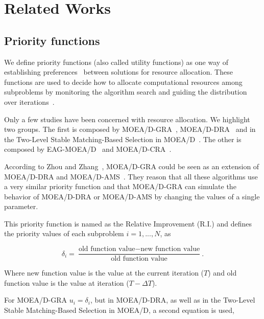 \section{Related Works}

\subsection{Priority functions}

We define priority functions (also called utility functions) as one way of establishing preferences~\cite{chankong1983multiobjective} between solutions for resource allocation. These functions are used to decide how to allocate computational resources among subproblems by monitoring the algorithm search and guiding the distribution over iterations~\cite{cai2015external}. 

Only a few studies have been concerned with resource allocation. We highlight two groups. The first is composed by MOEA/D-GRA~\cite{zhou2016all}, MOEA/D-DRA~\cite{zhang2009performance} and in the Two-Level Stable Matching-Based Selection in MOEA/D~\cite{nasir2011improved}. The other is composed by EAG-MOEA/D~\cite{cai2015external} and MOEA/D-CRA~\cite{kang2018collaborative}.

According to Zhou and Zhang~\cite{zhou2016all}, MOEA/D-GRA could be seen as an extension of MOEA/D-DRA and MOEA/D-AMS~\cite{chiang2011moea}. They reason that all these algorithms use a very similar priority function and that MOEA/D-GRA can simulate the behavior of MOEA/D-DRA or MOEA/D-AMS by changing the values of a single parameter. 

This priority function is named as the Relative Improvement (R.I.) and defines the priority values of each subproblem $i=1,...,N$, as

\begin{equation}\label{priority}
\delta_i = \dfrac{\text{old function value}-\text{new function value}}{\text{old function value}}.
\end{equation}

Where new function value is the value at the current iteration ($T$) and old function value is the value at iteration ($T - \Delta T$).

For MOEA/D-GRA $u_i = \delta_i$, but in MOEA/D-DRA, as well as in the Two-Level Stable Matching-Based Selection in MOEA/D, a second equation is used,

